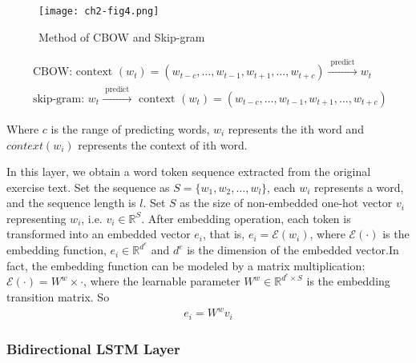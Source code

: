 \begin{figure}[htbp!]
	\centering
	\texttt{[image: ch2-fig4.png]}
	\caption{Method of CBOW and Skip-gram}\label{ch2-fig4}
\end{figure}


\begin{align}
	\text{ CBOW: context }(w_{t})=(w_{t-c}, \ldots, w_{t-1}, w_{t+1}, \ldots, w_{t+c}) \stackrel{\text{ predict }}{\longrightarrow} w_{t} \label{fml-cbow} \\
	\text{ skip-gram: } w_{t} \stackrel{\text{ predict }}{\longrightarrow} \text{ context }(w_{t})=(w_{t-c}, \ldots, w_{t-1}, w_{t+1}, \ldots, w_{t+c}) \label{fml-sg}
\end{align}

Where \(c\) is the range of predicting words, \(w_i\) represents the ith word and \(context(w_i)\) represents the context of ith word.

In this layer, we obtain a word token sequence extracted from the original exercise text. Set the sequence as \(S=\{w_1,w_2,\ldots,w_l\} \), each \(w_i\) represents a word, and the sequence length is \(l\). Set \(S\) as the size of non-embedded one-hot vector \(v_i\) representing \(w_i\), i.e. \(v_i\in \mathbb{R}^{S}\). After embedding operation, each token is transformed into an embedded vector \(e_i\), that is, \(e_i=\mathcal{E}(w_i)\), where \(\mathcal{E}(\cdot)\) is the embedding function, \(e_i\in \mathbb{R}^{d^{e}}\) and \(d^e\) is the dimension of the embedded vector.In fact, the embedding function can be modeled by a matrix multiplication: \(\mathcal {E} (\cdot) = W^w\times \cdot \), where the learnable parameter \(W^w\in \mathbb {R} ^ {d^{e}\times S}\) is the embedding transition matrix. So
\begin{align}
	e_i = W^w v_i
\end{align}

\subsubsection{Bidirectional LSTM Layer}


